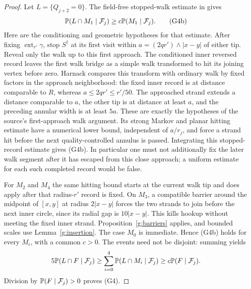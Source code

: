 \begin{proof}
Let \(L=\{Q_{j+2}=0\}\). The field-free stopped-walk estimate in
\cite[proof of (3.38), case \(i=1\)]{SSdiscrete} gives
\[
 \mathbb P(L\cap M_1\mid\mathcal F_j)
       \geq c\mathbb P(M_1\mid\mathcal F_j).             \tag{G4b}
\]
Here are the conditioning and geometric hypotheses for that estimate.
After fixing \(\operatorname{ext}_{r'}\gamma\), stop \(S^\dagger\)
at its first visit within
\(a=(2q r')\wedge|x-y|\) of either tip. Reveal only the walk up to
this first approach. The conditioned inner reversed record leaves
the first walk bridge as a simple walk transformed to hit its
joining vertex before zero. Harnack compares this transform with
ordinary walk by fixed factors in the approach neighborhood: the
fixed inner record is at distance comparable to \(R\), whereas
\(a\leq2q r'\leq r'/50\). The approached strand extends a distance
comparable to \(a\), the other tip is at distance at least \(a\),
and the preceding annular width is at least \(5a\).
These are exactly the hypotheses of the source's first-approach
walk argument. Its strong Markov and planar hitting estimate have
a numerical lower bound, independent of \(a/r_j\), and force a
strand hit before the next quality-controlled annulus is passed.
Integrating this stopped-record estimate gives (G4b). In particular
one must not additionally fix the later walk segment after it has
escaped from this close approach; a uniform estimate for each such
completed record would be false.

For \(M_2\) and \(M_4\) the same hitting bound starts at the current
walk tip and does apply after that radius-\(r'\) record is fixed.
On \(M_3\), a compatible barrier around the midpoint of \([x,y]\)
at radius \(2|x-y|\) forces the two strands to join before the next
inner circle, since its radial gap is \(10|x-y|\). This kills hookup
without meeting the fixed inner strand. Proposition~\ref{g:barriers}
applies, and bounded scales use Lemma~\ref{g:insertion}. The case
\(M_0\) is immediate. Hence (G4b) holds for every \(M_i\), with a
common \(c>0\). The events need not be disjoint: summing yields
\[
 5\mathbb P(L\cap F\mid\mathcal F_j)
 \geq\sum_{i=0}^4\mathbb P(L\cap M_i\mid\mathcal F_j)
 \geq c\mathbb P(F\mid\mathcal F_j).
\]
Division by \(\mathbb P(F\mid\mathcal F_j)>0\) proves (G4).


\end{proof}
